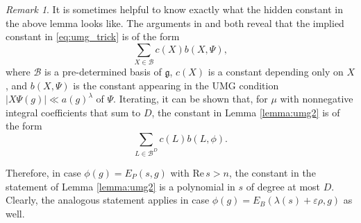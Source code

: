 \documentclass[11pt]{amsart}
\numberwithin{theorem}{section}
\numberwithin{equation}{section}
\theoremstyle{remark}
\newtheorem*{remark}{Remark}
\theoremstyle{definition}
\newcommand{\re}{\mathrm{Re}\,}
\newcommand{\Lg}{\mathfrak{g}}
\begin{document}
\begin{remark}
It is sometimes helpful to know exactly what the hidden constant in the above lemma looks like. The arguments in \cite{Gar18} and \cite{GMP17} both reveal that the implied constant in \eqref{eq:umg_trick} is of the form
\begin{equation*}
\sum_{X \in \mathcal B} c(X)b(X,\Psi),
\end{equation*}
where $\mathcal B$ is a pre-determined basis of $\Lg$, $c(X)$ is a constant depending only on $X$, and $b(X,\Psi)$ is the constant appearing in the UMG condition $|X\Psi(g)| \ll a(g)^\lambda$ of $\Psi$. Iterating, it can be shown that, for $\mu$ with nonnegative integral coefficients that sum to $D$, the constant in Lemma \ref{lemma:umg2} is of the form
\begin{equation*}
\sum_{L \in \mathcal B^D} c(L)b(L,\phi).
\end{equation*}

Therefore, in case $\phi(g) = E_P(s,g)$ with $\re s > n$, the constant in the statement of Lemma \ref{lemma:umg2} is a polynomial in $s$ of degree at most $D$. Clearly, the analogous statement applies in case $\phi(g) = E_B(\lambda(s)+\varepsilon\rho,g)$ as well.
\end{remark}
\end{document}
